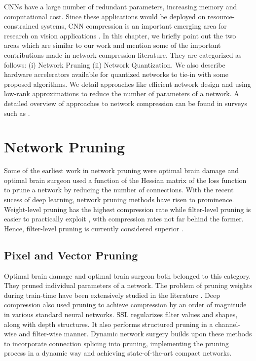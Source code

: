 \noindent CNNs have a large number of redundant parameters, increasing memory and computational cost. Since these applications would be deployed on resource-constrained systems, CNN compression is an important emerging area for research on vision applications \cite{courbariaux2016binarized,zhou2016dorefa, han2015deep, liu2017learning, moczulski2015acdc, yang2015deep, he2016deep, iandola2016squeezenet}. In this chapter, we briefly point out the two areas which are similar to our work and mention some of the important contributions made in network compression literature. They are categorized as follows: (i) Network Pruning (ii) Network Quantization. We also describe hardware accelerators  available for quantized networks to tie-in with some proposed algorithms. We detail approaches like efficient network design and using low-rank approximations to reduce the  number of parameters of a network. A detailed overview of approaches to network compression can be found in surveys such as \cite{cheng2018recent, sze2017efficient}.
 
\section{Network Pruning} 

\noindent Some of the earliest work in network pruning were optimal brain damage \cite{lecun1990optimal} and optimal brain surgeon \cite{hassibi1993optimal} used a function of the Hessian matrix of the loss function to prune a network by reducing the number of connections. With the recent sucess of deep learning, network pruning methods have risen to prominence. Weight-level pruning has the highest compression rate while filter-level pruning is easier to practically exploit , with compression rates not far behind the former. Hence, filter-level pruning is currently considered superior \cite{liu2017learning}. 

\subsection{Pixel and Vector Pruning}

\noindent Optimal brain damage and optimal brain surgeon both belonged to this category. They pruned individual parameters of a network. The problem of pruning weights during train-time have been extensively studied in the literature \cite{sze2017efficient}. Deep compression \cite{han2015learning} also used pruning to achieve compression by an order of magnitude in various standard neural networks. SSL \cite{wen2016structured} regularizes filter values and shapes, along with depth structures. It also performs structured pruning in a channel-wise and filter-wise manner. Dynamic network surgery \cite{guo2016dynamic} builds upon these methods to incorporate connection splicing into pruning, implementing the pruning process in a dynamic way and achieving state-of-the-art compact networks.

